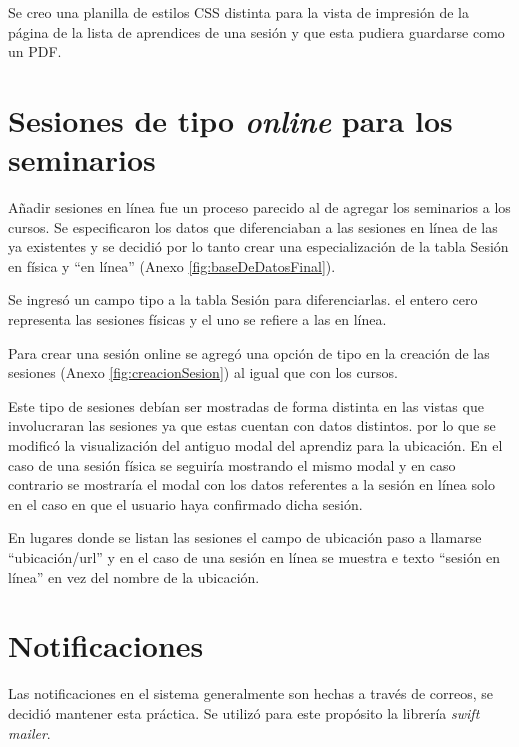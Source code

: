	Se creo una planilla de estilos \gls{CSS} distinta para la vista de impresión de la página de la lista de aprendices de una sesión y que esta pudiera guardarse como un \gls{PDF}. 


	\section{Sesiones de tipo \emph{online} para los seminarios} %
	\label{sec:sesiones_de_seminario_tipo_}

	Añadir sesiones en línea fue un proceso parecido al de agregar los seminarios a los cursos. Se especificaron los datos que diferenciaban a las sesiones en línea de las ya existentes y se decidió por lo tanto crear una especialización de la tabla Sesión en física y ``en línea'' (Anexo \ref{fig:baseDeDatosFinal}).

	Se ingresó un campo tipo a la tabla Sesión para diferenciarlas. el entero cero representa las sesiones físicas y el uno se refiere a las en línea.

	Para crear una sesión online se agregó una opción de tipo en la creación de las sesiones (Anexo \ref{fig:creacionSesion}) al igual que con los cursos.

	Este tipo de sesiones debían ser mostradas de forma distinta en las vistas que involucraran las sesiones ya que estas cuentan con datos distintos. por lo que se modificó la visualización del antiguo modal del aprendiz para la ubicación. En el caso de una sesión física se seguiría mostrando el mismo modal y en caso contrario se mostraría el modal con los datos referentes a la sesión en línea solo en el caso en que el usuario haya confirmado dicha sesión.

	En lugares donde se listan las sesiones el campo de ubicación paso a llamarse ``ubicación/url'' y en el caso de una sesión en línea se muestra e texto ``sesión en línea'' en vez del nombre de la ubicación. 


	\section{Notificaciones} %
	\label{sec:notificaciones}
	
	Las notificaciones en el sistema generalmente son hechas a través de correos, se decidió mantener esta práctica. Se utilizó para este propósito la librería \emph{swift mailer}.

